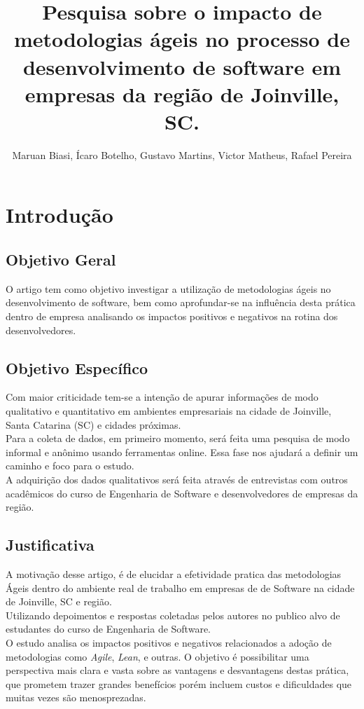 \documentclass[12pt]{article}
\title{Pesquisa sobre o impacto de metodologias ágeis no processo de desenvolvimento de software em empresas da região de Joinville, SC.}
\author{Maruan Biasi\inst{1}, Ícaro Botelho\inst{1}, Gustavo Martins\inst{1}, Victor Matheus\inst{1}, Rafael Pereira\inst{1}}
\begin{document}
 

\maketitle

\begin{abstract}

\end{abstract}
     
\begin{resumo} 

\end{resumo}
\section{Introdução}
\subsection{Objetivo Geral}

O artigo tem como objetivo investigar a utilização de metodologias ágeis no desenvolvimento de software, bem como aprofundar-se na influência desta prática dentro de empresa analisando os impactos positivos e negativos na rotina dos desenvolvedores.

\subsection{Objetivo Específico}

Com maior criticidade tem-se a intenção de apurar informações de modo qualitativo e quantitativo em ambientes empresariais na cidade de Joinville, Santa Catarina (SC) e cidades próximas.
\\Para a coleta de dados, em primeiro momento, será feita uma pesquisa de modo informal e anônimo usando ferramentas online. Essa fase nos ajudará a definir um caminho e foco para o estudo.
\\A adquirição dos dados qualitativos será feita através de entrevistas com outros acadêmicos do curso de Engenharia de Software e desenvolvedores de empresas da região.



\subsection{Justificativa}

A motivação desse artigo, é de elucidar a efetividade pratica das metodologias Ágeis dentro do ambiente real de trabalho em empresas de de Software na cidade de Joinville, SC e região.
\\Utilizando depoimentos e respostas coletadas pelos autores no publico alvo de estudantes do curso de Engenharia de Software.
\\O estudo analisa os impactos positivos e negativos relacionados a adoção de metodologias como \textit{Agile}, \textit{Lean}, e outras. O objetivo é possibilitar uma perspectiva mais clara e vasta sobre as vantagens e desvantagens destas prática, que prometem trazer grandes benefícios porém incluem custos e dificuldades que muitas vezes são menosprezadas.
\end{document}
